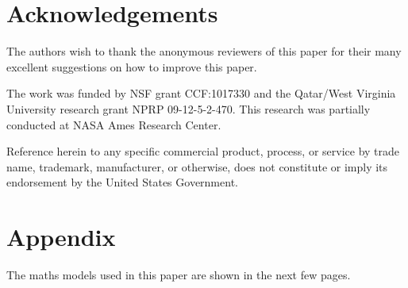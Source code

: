 \documentclass[10pt,journal,compsoc]{IEEEtran}
\newenvironment{changed}{\par\color{MyDarkBlue}}{\par}
\begin{document}
   


\section*{Acknowledgements}
\begin{changed}
The authors wish to thank the anonymous reviewers of this
paper for their many excellent suggestions on how to improve this paper.
\end{changed}
The work was funded by NSF grant CCF:1017330 and the
Qatar/West Virginia University research grant NPRP
09-12-5-2-470.  This research was partially
conducted at NASA Ames Research Center. 

Reference
herein to any specific commercial product, process,
or service by trade name, trademark, manufacturer,
or otherwise, does not constitute or imply its endorsement by the United States Government.


    

\color{MyDarkBlue}
\section*{Appendix}
The maths models used in this paper are shown in the next few pages.
\color{black}
\end{document}
